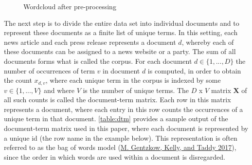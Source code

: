 \documentclass[
]{article}
\begin{document}
\begin{figure}

{\centering {}

}

\caption{Wordcloud after pre-processing \label{fig:wordclouds2}}\label{fig:wordclouds2}
\end{figure}

The next step is to divide the entire data set into individual documents
and to represent these documents as a finite list of unique terms. In
this setting, each news article and each press release represents a
document \(d\), whereby each of these documents can be assigned to a
news website or a party. The sum of all documents forms what is called
the corpus. For each document \(d \in \lbrace 1,...,D \rbrace\) the
number of occurrences of term \(v\) in document \(d\) is computed, in
order to obtain the count \(x_{d,v}\), where each unique term in the
corpus is indexed by some \(v \in \lbrace 1,...,V \rbrace\) and where
\(V\) is the number of unique terms. The \(D\) x \(V\) matrix
\(\boldsymbol{X}\) of all such counts is called the document-term
matrix. Each row in this matrix represents a document, where each entry
in this row counts the occurrences of a unique term in that document.
\autoref{table:dtm} provides a sample output of the document-term matrix
used in this paper, where each document is represented by a unique id
(the row name in the example below). This representation is often
referred to as the bag of words model
(\protect\hyperlink{ref-gentzkow_text_2017}{M. Gentzkow, Kelly, and
Taddy 2017}), since the order in which words are used within a document
is disregarded.
\end{document}
